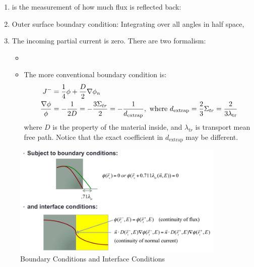 \documentclass{school-22.211-notes}
\begin{document}
\begin{enumerate}
\item {} is the measurement of how much flux is reflected back: 

\item Outer surface boundary condition: 
Integrating over all angles in half space,

\item The incoming partial current is zero. There are two formalism: 
  \begin{itemize}
  \item 
  \item The more conventional boundary condition is: 
    \begin{align}
      J^- &= \frac{1}{4} \phi + \frac{D}{2} \nabla \phi_n \\
      \frac{\nabla \phi}{\phi} &= - \frac{1}{2D} = - \frac{3\Sigma_{tr}}{2} = - \frac{1}{d_{\mathrm{extrap}}}, \mbox{ where } d_{\mathrm{extrap}} = \frac{2}{3} \Sigma_{tr}  = \frac{2}{3 \lambda_{\mathrm{tr}}} 
    \end{align}
    where $D$ is the property of the material inside, and $\lambda_{tr}$ is transport mean free path. Notice that the exact coefficient in $d_{\mathrm{extrap}}$ may be different. 
  \end{itemize}
\end{enumerate}

\clearpage
{}
\begin{figure}
  \centering
  \includegraphics[width=4in]{images/dfs/boundary-interface.png}
  \caption{Boundary Conditions and Interface Conditions} \label{boundary-interface}
\end{figure}
\end{document}
